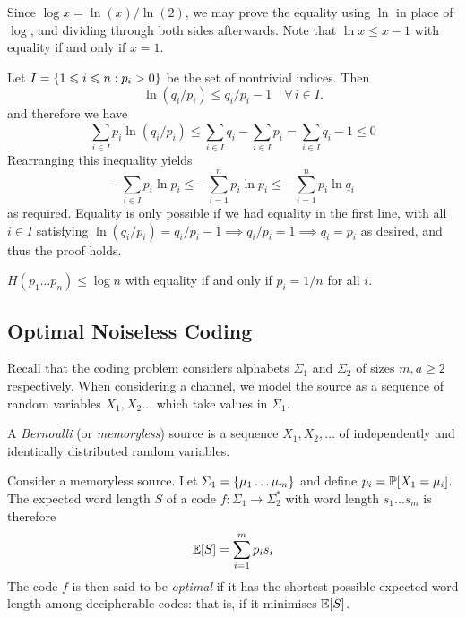 \documentclass{article}
\begin{document}
\begin{prf}
    Since $\log x = \ln (x) / \ln (2)$,
    we may prove the equality using $\ln$ in place of $\log$,
    and dividing through both sides afterwards.
    Note that $\ln x \leq x-1$ with equality if and only if $x=1$.
    
    Let $I = \set{1 \leq i \leq n: p_i > 0}$
    be the set of nontrivial indices. Then
    \[
	\ln(q_i/p_i) \leq
	q_i / p_i - 1
	\quad \forall \, i \in I.
	\]
	and therefore we have
	\[
	\sum_{i \in I} p_i \ln (q_i / p_i) \leq
	\sum_{i \in I} q_i - \sum_{i \in I} p_i =
	\sum_{i \in I} q_i - 1 \leq 0
	\]
	Rearranging this inequality yields
	\[
	- \sum_{i \in I} p_i \ln p_i \leq
	- \sum_{i=1}^n p_i \ln p_i \leq
	- \sum_{i=1}^n p_i \ln q_i
	\]
	as required.
	Equality is only possible if we had equality in the first line,
	with all $i \in I$ satisfying
	$\ln(q_i/p_i) = q_i / p_i - 1 \implies q_i / p_i = 1 \implies q_i = p_i$
	as desired, and thus the proof holds.
\end{prf}

\begin{corollary}
    $H(p_1 \dots p_n) \leq \log n$
    with equality if and only if
    $p_i = 1/n$ for all $i$.
\end{corollary}


\subsection{Optimal Noiseless Coding}

Recall that the coding problem considers alphabets $\Sigma_1$ and $\Sigma_2$
of sizes $m, a \geq 2$ respectively.
When considering a channel,
we model the source as a sequence of random variables $X_1, X_2 \dots$
which take values in $\Sigma_1$.

\begin{definition}
	\label{memoryless-source}
    A \textit{Bernoulli} (or \textit{memoryless}) source
    is a sequence $X_1, X_2, \dots$
    of independently and identically distributed random variables.
\end{definition}

\begin{definition}
	\label{optimal-code}
    Consider a memoryless source.
    Let $\Sigma_1 = \set{\mu_1 \dots \mu_m}$
    and define $p_i = \P[X_1 = \mu_i]$.
    The expected word length $S$ of a code $f : \Sigma_1 \to \Sigma_2^*$
    with word length $s_1 \dots s_m$ is therefore
	\[
	\E[S] = \sum_{i=1}^m p_i s_i
	\]
	The code $f$ is then said to be \textit{optimal}
	if it has the shortest possible expected word length among decipherable codes:
	that is, if it minimises $\E[S]$.
\end{definition}
\end{document}

